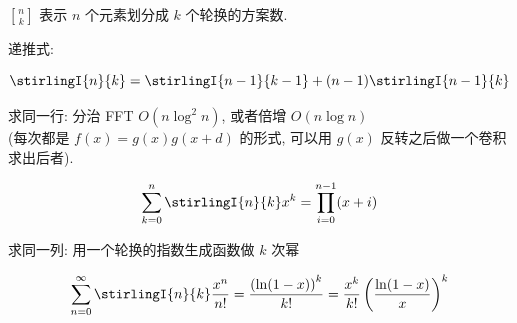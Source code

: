 \(n\brack k\) 表示 \(n\) 个元素划分成 \(k\) 个轮换的方案数.

递推式:

\[
    \stirlingI{n}{k} = \stirlingI{n-1}{k-1} + (n-1)\stirlingI{n-1}{k}
\]

求同一行: 分治 FFT \(O(n\log ^2 n)\), 或者倍增 \(O(n\log n)\) \\(每次都是 \(f(x) = g(x) g(x + d)\) 的形式, 可以用 \(g(x)\) 反转之后做一个卷积求出后者).

\[
    \sum_{k = 0}^n \stirlingI{n}{k} x^k = \prod_{i = 0}^{n - 1} (x + i)
\]

求同一列: 用一个轮换的指数生成函数做 \(k\) 次幂

\[
    \sum_{n = 0}^\infty \stirlingI{n}{k} \frac{x^n}{n!} = \frac{\left(\ln (1 - x)\right)^k}{k!} = \frac{x^k}{k!} \left( \frac{\ln (1 - x)}{x} \right)^k
\]
